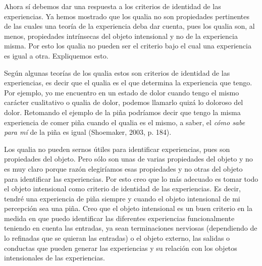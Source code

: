 \documentclass[]{book}
\begin{document}
\begin{refsection}
Ahora sí debemos dar una respuesta a los criterios de identidad de las
experiencias. Ya hemos mostrado que los qualia no son propiedades
pertinentes de las cuales una teoría de la experiencia deba dar cuenta,
pues los qualia son, al menos, propiedades intrínsecas del objeto
intensional y no de la experiencia misma. Por esto los qualia no pueden
ser el criterio bajo el cual una experiencia es igual a otra.
Expliquemos esto.

Según algunas teorías de los qualia estos son criterios de identidad de
las experiencias, es decir que el qualia es el que determina la
experiencia que tengo. Por ejemplo, yo me encuentro en un estado de
dolor cuando tengo el mismo carácter cualitativo o qualia de dolor,
podemos llamarlo quizá lo doloroso del dolor. Retomando el ejemplo de la
piña podríamos decir que tengo la misma experiencia de comer piña cuando
el qualia es el mismo, a saber, el \emph{cómo sabe para mí} de la piña
es igual (Shoemaker, 2003, p. 184).

Los qualia no pueden sernos útiles para identificar experiencias, pues
son propiedades del objeto. Pero sólo son unas de varias propiedades del
objeto y no es muy claro porque razón elegiríamos esas propiedades y no
otras del objeto para identificar las experiencias. Por esto creo que lo
más adecuado es tomar todo el objeto intensional como criterio de
identidad de las experiencias. Es decir, tendré una experiencia de piña
siempre y cuando el objeto intensional de mi percepción sea una piña.
Creo que el objeto intensional es un buen criterio en la medida en que
puedo \protect\hypertarget{_Hlk508645306}{}{}identificar las diferentes
experiencias funcionalmente teniendo en cuenta las entradas, ya sean
terminaciones nerviosas (dependiendo de lo refinadas que se quieran las
entradas) o el objeto externo, las salidas o conductas que pueden
generar las experiencias y su relación con los objetos intensionales de
las experiencias.


\nocite{Dennett2003}
\nocite{Harman2003}
\nocite{Nagel2003}
\nocite{Shoemaker2003}


\printbibliography[heading=subbibliography,title={Referencias}]

\end{refsection}
\end{document}
